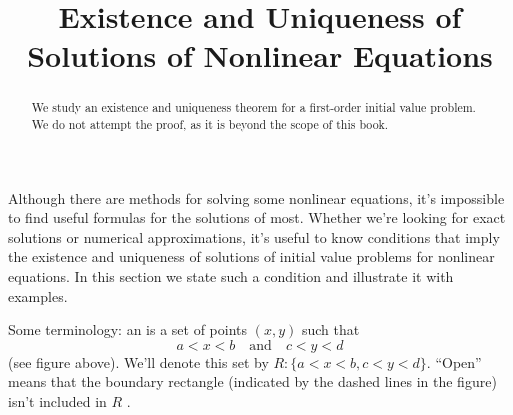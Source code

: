\documentclass{ximera}
\title{Existence and Uniqueness of Solutions of Nonlinear Equations}%
\begin{document}
\begin{abstract}
We study  an existence and uniqueness theorem for a first-order initial value problem.  We do not attempt the proof, as it is beyond the scope of this book.
\end{abstract}

\maketitle


Although  there are  methods for
 solving some nonlinear equations, it's
impossible to find  useful formulas for the solutions of most.
Whether we're looking for  exact solutions or numerical
approximations, it's useful to know  conditions that imply the
existence and uniqueness of solutions of initial value problems for
nonlinear equations. In this section we state  such a condition and
illustrate it with examples.


\begin{center}
\end{center}


Some terminology:
 an 
 is a set of points $(x,y)$ such that
$$
a<x<b\quad\mbox{and}\quad c<y<d
$$
 (see figure above).  We'll denote this set by
$R:  \{ a < x < b, c < y < d \}$.
 ``Open'' means that the
boundary rectangle (indicated by the dashed lines in
the figure) isn't  included in  $R$ .
\end{document}
